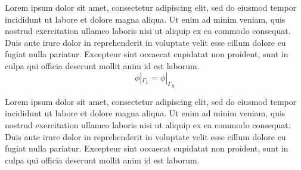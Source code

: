Lorem ipsum dolor sit amet, consectetur adipiscing elit, sed do eiusmod tempor incididunt ut labore et dolore magna aliqua. Ut enim ad minim veniam, quis nostrud exercitation ullamco laboris nisi ut aliquip ex ea commodo consequat. Duis aute irure dolor in reprehenderit in voluptate velit esse cillum dolore eu fugiat nulla pariatur. Excepteur sint occaecat cupidatat non proident, sunt in culpa qui officia deserunt mollit anim id est laborum.
%
\begin{equation}
{\phi}|_{\Gamma_L} = {\phi}|_{\Gamma_R}
\end{equation}

Lorem ipsum dolor sit amet, consectetur adipiscing elit, sed do eiusmod tempor incididunt ut labore et dolore magna aliqua. Ut enim ad minim veniam, quis nostrud exercitation ullamco laboris nisi ut aliquip ex ea commodo consequat. Duis aute irure dolor in reprehenderit in voluptate velit esse cillum dolore eu fugiat nulla pariatur. Excepteur sint occaecat cupidatat non proident, sunt in culpa qui officia deserunt mollit anim id est laborum.


